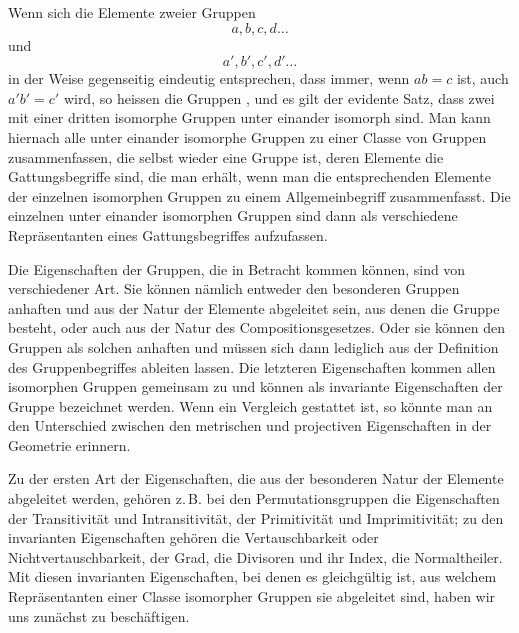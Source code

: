 

Wenn sich die Elemente zweier Gruppen
\[
a, b, c, d \ldots
\]
und
\[
a', b', c', d' \ldots
\]
in der Weise gegenseitig eindeutig entsprechen, dass immer, wenn $ab = c$ ist, auch $a'b' = c'$ wird, so heissen die Gruppen , und es gilt der evidente Satz, dass zwei mit einer dritten isomorphe Gruppen unter einander isomorph sind. Man kann hiernach alle unter einander isomorphe Gruppen zu einer Classe von Gruppen zusammenfassen, die selbst wieder eine Gruppe ist, deren Elemente die Gattungsbegriffe sind, die man erhält, wenn man die entsprechenden Elemente der einzelnen isomorphen Gruppen zu einem Allgemeinbegriff zusammenfasst. Die einzelnen unter einander isomorphen Gruppen sind dann als verschiedene Repräsentanten eines Gattungsbegriffes aufzufassen.

Die Eigenschaften der Gruppen, die in Betracht kommen können, sind von verschiedener Art. Sie können nämlich entweder den besonderen Gruppen anhaften und aus der Natur der Elemente abgeleitet sein, aus denen die Gruppe besteht, oder auch aus der Natur des Compositionsgesetzes. Oder sie können den Gruppen als solchen anhaften und müssen sich dann lediglich aus der Definition des Gruppenbegriffes ableiten lassen. Die letzteren Eigenschaften kommen allen isomorphen Gruppen gemeinsam zu und können als invariante Eigenschaften der Gruppe bezeichnet werden. Wenn ein Vergleich gestattet ist, so könnte man an den Unterschied zwischen den metrischen und projectiven Eigenschaften in der Geometrie erinnern.

Zu der ersten Art der Eigenschaften, die aus der besonderen Natur der Elemente abgeleitet werden, gehören z.\,B. bei den Permutationsgruppen die Eigenschaften der Transitivität und Intransitivität, der Primitivität und Imprimitivität; zu den invarianten Eigenschaften gehören die Vertauschbarkeit oder Nichtvertauschbarkeit, der Grad, die Divisoren und ihr Index, die Normaltheiler. Mit diesen invarianten Eigenschaften, bei denen es gleichgültig ist, aus welchem Repräsentanten einer Classe isomorpher Gruppen sie abgeleitet sind, haben wir uns zunächst zu beschäftigen.
